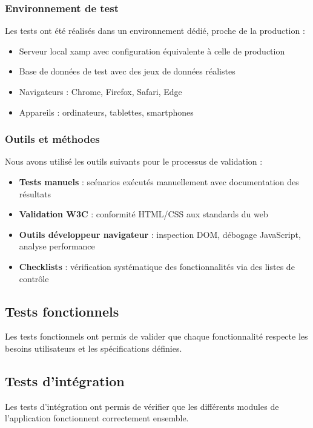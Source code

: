 \documentclass[a4paper,12pt]{article}
\begin{document}
\subsubsection{Environnement de test}
Les tests ont été réalisés dans un environnement dédié, proche de la production :
\begin{itemize}
  \item Serveur local xamp avec configuration équivalente à celle de production
  \item Base de données de test avec des jeux de données réalistes
  \item Navigateurs : Chrome, Firefox, Safari, Edge
  \item Appareils : ordinateurs, tablettes, smartphones
\end{itemize}

\subsubsection{Outils et méthodes}
Nous avons utilisé les outils suivants pour le processus de validation :
\begin{itemize}
  \item \textbf{Tests manuels} : scénarios exécutés manuellement avec documentation des résultats
  \item \textbf{Validation W3C} : conformité HTML/CSS aux standards du web
  \item \textbf{Outils développeur navigateur} : inspection DOM, débogage JavaScript, analyse performance
  \item \textbf{Checklists} : vérification systématique des fonctionnalités via des listes de contrôle
\end{itemize}

\subsection{Tests fonctionnels}
Les tests fonctionnels ont permis de valider que chaque fonctionnalité respecte les besoins utilisateurs et les spécifications définies.
\subsection{Tests d'intégration}
Les tests d'intégration ont permis de vérifier que les différents modules de l'application fonctionnent correctement ensemble.
\end{document}

